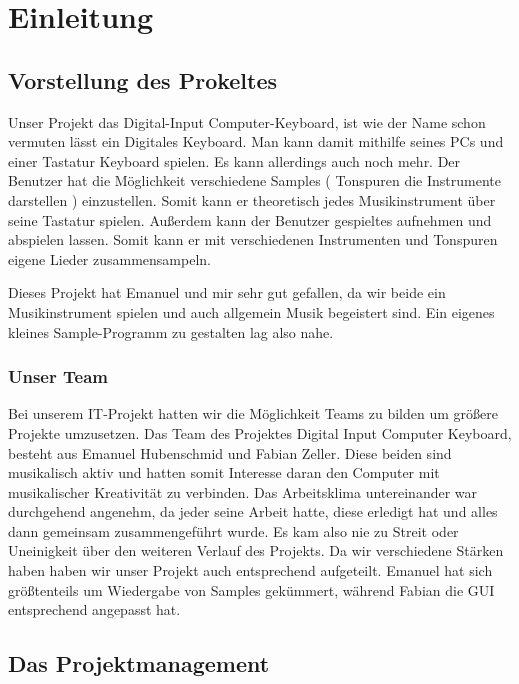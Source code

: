 \section{Einleitung}

\subsection{Vorstellung des Prokeltes}

Unser Projekt das Digital-Input Computer-Keyboard, ist wie der Name schon vermuten lässt ein 
Digitales Keyboard. Man kann damit mithilfe seines PCs und einer Tastatur Keyboard spielen. Es kann 
allerdings auch noch mehr. Der Benutzer hat die Möglichkeit verschiedene Samples ( Tonspuren die 
Instrumente darstellen ) einzustellen. Somit kann er theoretisch jedes Musikinstrument über seine 
Tastatur spielen. Außerdem kann der Benutzer gespieltes aufnehmen und abspielen lassen. Somit kann 
er mit verschiedenen Instrumenten und Tonspuren eigene Lieder zusammensampeln. 

Dieses Projekt hat Emanuel und mir sehr gut gefallen, da wir beide ein Musikinstrument spielen und 
auch allgemein Musik begeistert sind. Ein eigenes kleines Sample-Programm zu gestalten lag also 
nahe.


\subsubsection{Unser Team}

Bei unserem IT-Projekt hatten wir die Möglichkeit Teams zu bilden um größere Projekte umzusetzen. Das Team des Projektes Digital Input Computer Keyboard, besteht aus Emanuel Hubenschmid und Fabian Zeller. Diese beiden sind musikalisch aktiv und hatten somit Interesse daran den Computer mit musikalischer Kreativität zu verbinden. 
Das Arbeitsklima untereinander war durchgehend angenehm, da jeder seine Arbeit hatte, diese erledigt hat und alles dann gemeinsam zusammengeführt wurde. Es kam also nie zu Streit oder Uneinigkeit über den weiteren Verlauf des Projekts. Da wir verschiedene Stärken haben haben wir unser Projekt auch entsprechend aufgeteilt. Emanuel hat sich größtenteils um Wiedergabe von Samples gekümmert, während Fabian die GUI entsprechend angepasst hat.

\newpage


\subsection{Das Projektmanagement}
